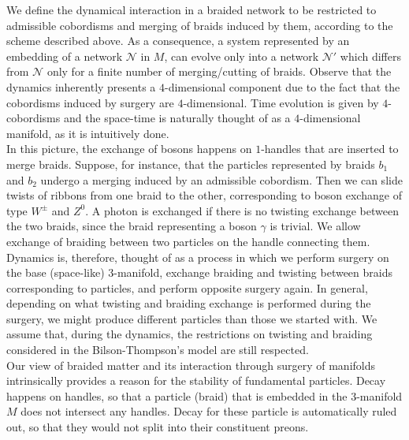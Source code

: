 \documentclass[aps,nofootinbib,amsfonts,superscriptaddress]{revtex4}
\begin{document}
We define the dynamical interaction in a braided network to be restricted to admissible cobordisms and merging of braids induced by them, according to the scheme described above. As a consequence, a system represented by an embedding of a network $\mathcal N$ in $M$, can evolve only into a network $\mathcal N'$ which differs from $\mathcal N$ only for a finite number of merging/cutting of braids. Observe that the dynamics inherently presents a $4$-dimensional component due to the fact that the cobordisms induced by surgery are $4$-dimensional. Time evolution is given by $4$-cobordisms and the space-time is naturally thought of as a $4$-dimensional manifold, as it is intuitively done.\\

In this picture, the exchange of bosons happens on $1$-handles that are inserted to merge braids. Suppose, for instance, that the particles represented by braids $b_1$ and $b_2$ undergo a merging induced by an admissible cobordism. Then we can slide twists of ribbons from one braid to the other, corresponding to boson exchange of type $W^{\pm}$ and $Z^0$. A photon is exchanged if there is no twisting exchange between the two braids, since the braid representing a boson $\gamma$ is trivial. We allow exchange of braiding between two particles on the handle connecting them. Dynamics is, therefore, thought of as a process in which we perform surgery on the base (space-like) $3$-manifold, exchange braiding and twisting between braids corresponding to particles, and perform opposite surgery again. In general, depending on what twisting and braiding exchange is performed during the surgery, we might produce different particles than those we started with. We assume that, during the dynamics, the restrictions on twisting and braiding considered in the Bilson-Thompson's model are still respected.\\

Our view of braided matter and its interaction through surgery of manifolds intrinsically provides a reason for the stability of fundamental particles. Decay happens on handles, so that a particle (braid) that is embedded in the $3$-manifold $M$ does not intersect any handles. Decay for these particle is automatically ruled out, so that they would not split into their constituent preons. \\
\end{document}
